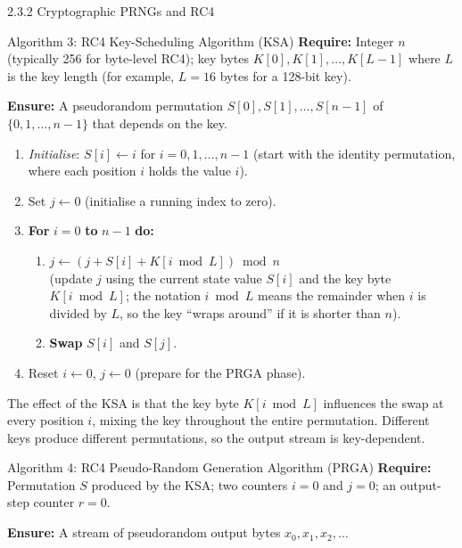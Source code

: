 \documentclass[aspectratio=169,10pt]{beamer}
\begin{document}
\begin{frame}[allowframebreaks]{2.3.2 Cryptographic PRNGs and RC4}
\framebreak

\begin{block}{Algorithm 3: RC4 Key-Scheduling Algorithm (KSA)}
\textbf{Require:} Integer $n$ (typically 256 for byte-level RC4);
key bytes $K[0], K[1], \ldots, K[L-1]$ where $L$ is the key length
(for example, $L = 16$ bytes for a 128-bit key).

\textbf{Ensure:} A pseudorandom permutation $S[0], S[1], \ldots, S[n-1]$
of $\{0,1,\ldots,n-1\}$ that depends on the key.

\begin{enumerate}
  \item \emph{Initialise}: $S[i] \leftarrow i$ for $i = 0, 1, \ldots, n-1$
    (start with the identity permutation, where each position $i$ holds the
    value $i$).
  \item Set $j \leftarrow 0$ (initialise a running index to zero).
  \item \textbf{For} $i = 0$ \textbf{to} $n-1$ \textbf{do:}
    \begin{enumerate}
      \item $j \leftarrow (j + S[i] + K[i \bmod L]) \bmod n$ \\
        (update $j$ using the current state value $S[i]$ and the key byte
        $K[i \bmod L]$; the notation $i \bmod L$ means the remainder when
        $i$ is divided by $L$, so the key ``wraps around'' if it is shorter
        than $n$).
      \item \textbf{Swap} $S[i]$ and $S[j]$.
    \end{enumerate}
  \item Reset $i \leftarrow 0$, $j \leftarrow 0$ (prepare for the PRGA phase).
\end{enumerate}

The effect of the KSA is that the key byte $K[i \bmod L]$ influences the
swap at every position $i$, mixing the key throughout the entire permutation.
Different keys produce different permutations, so the output stream is
key-dependent.
\end{block}

\begin{block}{Algorithm 4: RC4 Pseudo-Random Generation Algorithm (PRGA)}
\textbf{Require:} Permutation $S$ produced by the KSA; two counters
$i = 0$ and $j = 0$; an output-step counter $r = 0$.

\textbf{Ensure:} A stream of pseudorandom output bytes $x_0, x_1, x_2, \ldots$


\end{block}
\end{frame}
\end{document}
